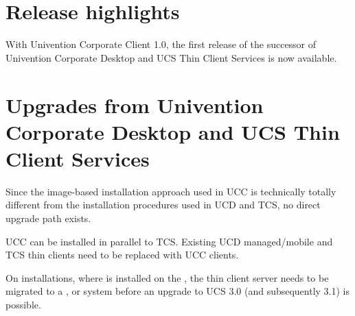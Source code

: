 


\newcommand{\ucsManualTitle}{UCC 1.0 Release Notes}
\newcommand{\ucsManualSubtitle}{Release notes for the installation of Univention Corporate Server (UCS) 1.0}
\newcommand{\ucsManualVersion}{1.0}
\newcommand{\ucsTechAuthor}{ & Univention GmbH & feedback@univention.de}

\setcounter{secnumdepth}{3}
\setcounter{tocdepth}{3}



\chapter{Release highlights}

With Univention Corporate Client 1.0, the first release of the
successor of Univention Corporate Desktop and UCS Thin Client Services
is now available.

\chapter{Upgrades from Univention Corporate Desktop and UCS Thin Client Services}
Since the image-based installation approach used in UCC is technically
totally different from the installation procedures used in UCD and
TCS, no direct upgrade path exists.

UCC can be installed in parallel to TCS. Existing UCD managed/mobile
and TCS thin clients need to be replaced with UCC clients.

On installations, where \ucsTCS{} is installed on the \ucsMaster{},
the thin client server needs to be migrated to
a \ucsBackup{}, \ucsSlave{} or \ucsMember{} system before an upgrade
to UCS 3.0 (and subsequently 3.1) is possible.

%



